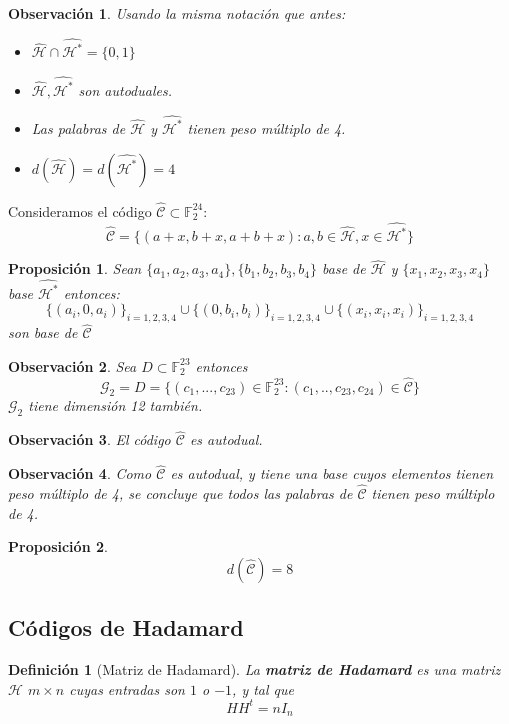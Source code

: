 \documentclass[spanish]{book}
\newtheorem{mydef}{Definición}
\newtheorem{obsv}{Observación}
\newtheorem{proposi}{Proposición}
\begin{document}
\begin{obsv}
	Usando la misma notación que antes:
	\begin{itemize}
		\item $\hat{\mathcal{H}} \cap \hat{\mathcal{H}^*}=\{0, 1\}$
		\item $\hat{\mathcal{H}}, \hat{\mathcal{H}^*}$ son autoduales.
		\item Las palabras de $\hat{\mathcal{H}}$ y $\hat{\mathcal{H}^*}$ tienen peso múltiplo de 4.
		\item $d(\hat{\mathcal{H}})=d(\hat{\mathcal{H}^*})=4$
	\end{itemize}
	 
\end{obsv}
Consideramos el código $\hat{\mathcal{C}} \subset \mathbb{F}_2^{24}$: 
$$
\hat{\mathcal{C}}=\{(a+x, b+x, a+b+x): a, b \in \hat{\mathcal{H}}, x\in \hat{\mathcal{H}^*}\}$$

\begin{proposi}
	Sean $\{a_1, a_2, a_3, a_4\}, \{b_1, b_2, b_3, b_4\}$ base de $\hat{\mathcal{H}}$ y $\{x_1, x_2, x_3, x_4\}$ base $\hat{\mathcal{H}^*}$ entonces:
	$$ \{(a_i, 0, a_i)\}_{i=1, 2, 3, 4} \cup \{(0, b_i, b_i)\}_ {i=1,2,3,4} \cup \{(x_i, x_i, x_i)\}_{i=1,2,3,4} $$ son base de $\hat{\mathcal{C}}$
\end{proposi}

\begin{obsv}
	Sea $D \subset \mathbb{F}_2^{23}$ entonces
	$$\mathcal{G}_2 = D=\{(c_1, ..., c_{23}) \in \mathbb{F}_2^{23}: (c_1, .., c_{23}, c_{24}) \in \hat{\mathcal{C}} \}$$
	$\mathcal{G}_2$ tiene dimensión 12 también.
\end{obsv}

\begin{obsv}
	El código $\hat{\mathcal{C}}$ es autodual.
\end{obsv}

\begin{obsv}
	Como $\hat{\mathcal{C}}$ es autodual, y tiene una base cuyos elementos tienen peso múltiplo de 4, se concluye que todos las palabras de  $\hat{\mathcal{C}}$ tienen peso múltiplo de 4.
\end{obsv}

\begin{proposi}
	$$d(\hat{\mathcal{C}})=8$$
\end{proposi}

\subsection{Códigos de Hadamard}
\begin{mydef}[Matriz de Hadamard]
	La \textbf{matriz de Hadamard} es una matriz $\mathcal{H}$ $m \times n$ cuyas entradas son $1$ o $-1$, y tal que $$HH^t=n I_n$$
\end{mydef}
\end{document}
